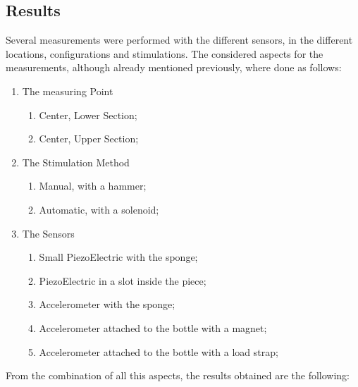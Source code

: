 \subsection{Results}
Several measurements were performed with the different sensors, in the different locations, configurations and stimulations. The considered aspects for the measurements, although already mentioned previously, where done as follows:
\begin{enumerate}
    \item The measuring Point
    \begin{enumerate}
        \item Center, Lower Section;
        \item Center, Upper Section;
    \end{enumerate}
    \item The Stimulation Method
    \begin{enumerate}
        \item Manual, with a hammer;
        \item Automatic, with a solenoid;
    \end{enumerate}
    \item The Sensors
    \begin{enumerate}
        \item Small PiezoElectric with the sponge;
        \item PiezoElectric in a slot inside the piece;
        \item Accelerometer with the sponge;
        \item Accelerometer attached to the bottle with a magnet;
        \item Accelerometer attached to the bottle with a load strap; 
    \end{enumerate}
\end{enumerate}
From the combination of all this aspects, the results obtained are the following:
